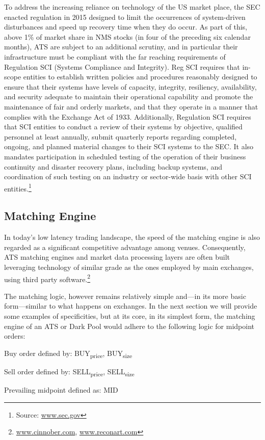 To address the increasing reliance on technology of the US market place, the SEC enacted regulation in 2015 designed to limit the occurrences of system-driven disturbances and speed up recovery time when they do occur. As part of this, above 1\% of market share in NMS stocks (in four of the preceding six calendar months), ATS are subject to an additional scrutiny, and in particular their infrastructure must be compliant with the far reaching requirements of Regulation SCI (Systems Compliance and Integrity). Reg SCI requires that in-scope entities to establish written policies and procedures reasonably designed to ensure that their systems have levels of capacity, integrity, resiliency, availability, and security adequate to maintain their operational capability and promote the maintenance of fair and orderly markets, and that they operate in a manner that complies with the Exchange Act of 1933. Additionally, Regulation SCI requires that SCI entities to conduct a review of their systems by objective, qualified personnel at least annually, submit quarterly reports regarding completed, ongoing, and planned material changes to their SCI systems to the SEC. It also mandates participation in scheduled testing of the operation of their business continuity and disaster recovery plans, including backup systems, and coordination of such testing on an industry or sector-wide basis with other SCI entities.\footnote{Source: \url{www.sec.gov}}


\subsection{Matching Engine}

In today's low latency trading landscape, the speed of the matching engine is also regarded as a significant competitive advantage among venues. Consequently, ATS  matching engines and market data processing layers are often built leveraging technology of similar grade as the ones employed by main exchanges, using third party software.\footnote{\url{www.cinnober.com}, \url{www.reconart.com}}


The matching logic, however remains relatively simple and---in its more basic form---similar to what happens on exchanges. In the next section we will provide some examples of specificities, but at its core, in its simplest form, the matching engine of an ATS or Dark Pool would adhere to the following logic for midpoint orders: \twomedskip


\noindent Buy order defined by: BUY\textsubscript{price}, BUY\textsubscript{size} \par
\noindent Sell order defined by: SELL\textsubscript{price}, SELL\textsubscript{size}  \par
\noindent Prevailing midpoint defined as: MID \twomedskip

